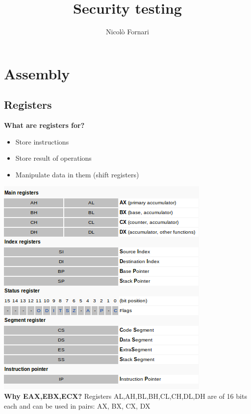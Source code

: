 \documentclass[10pt,a4paper]{book}
\author{Nicolò Fornari}
\title{Security testing}
\begin{document}
\chapter{Assembly}
\section{Registers}
\textbf{What are registers for?}
\begin{itemize}[noitemsep,nolistsep]
\item Store instructions
\item Store result of operations
\item Manipulate data in them (shift registers)
\end{itemize}
\includegraphics[scale=0.6]{registers.png}\\
\textbf{Why EAX,EBX,ECX?}
Registers AL,AH,BL,BH,CL,CH,DL,DH are of 16 bits each and can be used in pairs: AX, BX, CX, DX
\newpage
\end{document}
